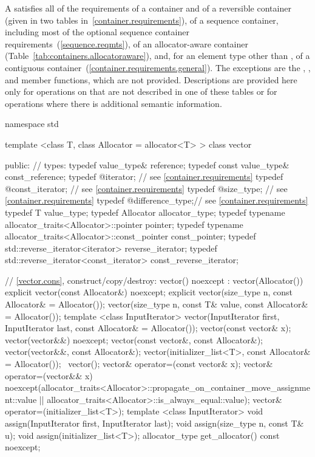 \pnum
A  satisfies all of the requirements of a container and of a
reversible container (given in two tables in~\ref{container.requirements}), of a
sequence container, including most of the optional sequence container
requirements~(\ref{sequence.reqmts}), of an allocator-aware container
(Table~\ref{tab:containers.allocatoraware}),
and, for an element type other than ,
of a contiguous container~(\ref{container.requirements.general}).
The exceptions are the
, , and  member functions, which are not
provided. Descriptions are provided here only for operations on 
that are not described in one of these tables or for operations where there is
additional semantic information.

\begin{codeblock}
namespace std {
  template <class T, class Allocator = allocator<T> >
  class vector {
  public:
    // types:
    typedef value_type&                           reference;
    typedef const value_type&                     const_reference;
    typedef @\impdef@                iterator;       // see \ref{container.requirements}
    typedef @\impdef@                const_iterator; // see \ref{container.requirements}
    typedef @\impdef@                size_type;      // see \ref{container.requirements}
    typedef @\impdef@                difference_type;// see \ref{container.requirements}
    typedef T                                     value_type;
    typedef Allocator                             allocator_type;
    typedef typename allocator_traits<Allocator>::pointer           pointer;
    typedef typename allocator_traits<Allocator>::const_pointer     const_pointer;
    typedef std::reverse_iterator<iterator>       reverse_iterator;
    typedef std::reverse_iterator<const_iterator> const_reverse_iterator;

    // \ref{vector.cons}, construct/copy/destroy:
    vector() noexcept : vector(Allocator()) { }
    explicit vector(const Allocator&) noexcept;
    explicit vector(size_type n, const Allocator& = Allocator());
    vector(size_type n, const T& value, const Allocator& = Allocator());
    template <class InputIterator>
      vector(InputIterator first, InputIterator last, const Allocator& = Allocator());
    vector(const vector& x);
    vector(vector&&) noexcept;
    vector(const vector&, const Allocator&);
    vector(vector&&, const Allocator&);
    vector(initializer_list<T>, const Allocator& = Allocator());
   ~vector();
    vector& operator=(const vector& x);
    vector& operator=(vector&& x)
      noexcept(allocator_traits<Allocator>::propagate_on_container_move_assignment::value ||
               allocator_traits<Allocator>::is_always_equal::value);
    vector& operator=(initializer_list<T>);
    template <class InputIterator>
      void assign(InputIterator first, InputIterator last);
    void assign(size_type n, const T& u);
    void assign(initializer_list<T>);
    allocator_type get_allocator() const noexcept;

}}
\end{codeblock}
